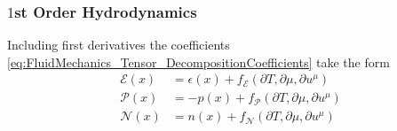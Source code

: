 \subsubsection{$1$st Order Hydrodynamics}

Including first derivatives the coefficients \eqref{eq:FluidMechanics_Tensor_DecompositionCoefficients} take the form
\begin{subequations}
    \begin{align}
        \mathcal{E}(x) & =\epsilon(x)+f_{\mathcal{E}}(\partial T,\partial\mu,\partial u^\mu) \\
        \mathcal{P}(x) & =-p(x)+f_{\mathcal{P}}(\partial T,\partial\mu,\partial u^\mu)       \\
        \mathcal{N}(x) & =n(x)+f_{\mathcal{N}}(\partial T,\partial\mu,\partial u^\mu)
    \end{align}
\end{subequations}

